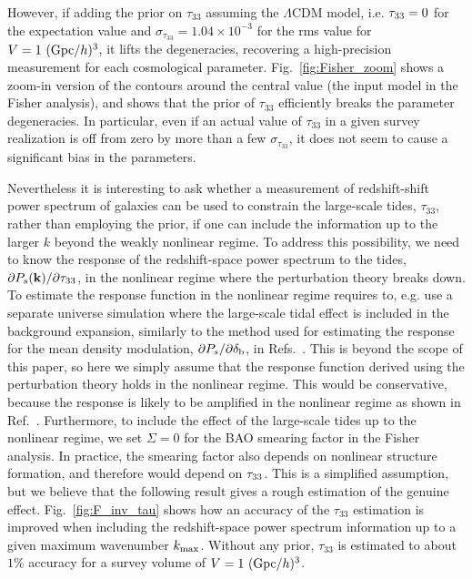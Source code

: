 \documentclass[prd,onecolumn,notitlepage,amsmath,amssymb,floatfix,superscriptaddress]{revtex4-1}
\newcommand{\bk}{{\bf k}}
\newcommand{\br}{{\rm b}}
\begin{document}
However, if adding the prior on $\tau_{33}$ assuming the $\Lambda$CDM model, i.e. $\tau_{\rm 33}=0$ for the expectation value and 
$\sigma_{\tau_{33}}=1.04\times 10^{-3}$ for the rms value for $V=1~({\rm Gpc}/h)^3$, it lifts the degeneracies, recovering a high-precision 
measurement for each cosmological parameter. Fig.~\ref{fig:Fisher_zoom} shows a zoom-in version of the contours around the central value (the input model in the Fisher analysis), and shows that the prior of $\tau_{33}$ efficiently breaks the parameter degeneracies. In particular, even if an actual value of $\tau_{33}$ in a given survey realization is off from zero by more than a few $\sigma_{\tau_{33}}$, it does not seem to cause a significant bias in 
the parameters. 


Nevertheless it is interesting to ask whether a measurement of redshift-shift power spectrum of galaxies can be used to constrain the large-scale tides,
 $\tau_{33}$, rather than employing the prior, if one can include the information up to the larger $k$ beyond the weakly nonlinear regime. To address this possibility, we need to know the response of the redshift-space power spectrum to the tides, $\partial P_{s}(\bk)/\partial \tau_{33}$, in the nonlinear regime where  the perturbation theory breaks down. To estimate the response function in the nonlinear regime requires to, e.g. use a separate universe simulation where the large-scale tidal effect is included in the background expansion, similarly to the method used for estimating the response for the mean density modulation, $\partial P_s/\partial \delta_\br$, in Refs.~\cite{Lietal:14a,Lietal:14b,Wagneretal:15,Baldaufetal:16}. This is beyond the scope of this paper, so here we simply assume that the response function derived using the perturbation theory holds in the nonlinear regime. This would be conservative, because the response is likely to be amplified in the nonlinear regime as shown in Ref.~\cite{Lietal:14a}. Furthermore, to include the effect of the large-scale tides up to the nonlinear regime, we set $\Sigma=0$ for the BAO smearing factor in the Fisher analysis. In practice, the smearing factor also depends on nonlinear structure formation, and therefore would depend on $\tau_{\rm 33}$. This is a simplified assumption, but we believe that the following result gives a rough estimation of the genuine effect. 
Fig.~\ref{fig:F_inv_tau} shows how an accuracy of the $\tau_{33}$ estimation is improved when including the redshift-space power spectrum information up to a given maximum wavenumber $k_{\rm max}$.
Without any prior, $\tau_{33}$ is estimated to about $1\%$ accuracy for a survey volume of $V=1~({\rm Gpc}/h)^3$. 
\end{document}
